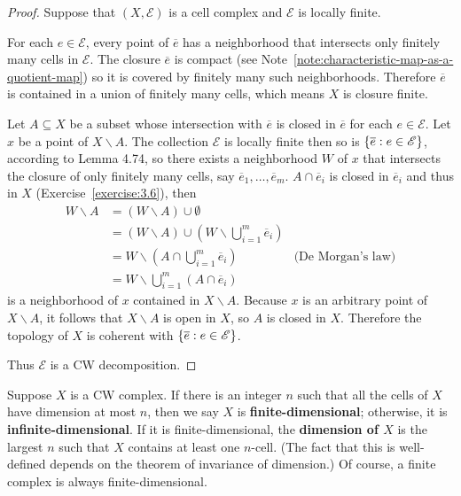 \begin{proof}
	Suppose that \( (X, \mathscr{E}) \) is a cell complex and \( \mathscr{E} \) is locally finite.

	For each \( e\in \mathscr{E} \), every point of \( \overline{e} \) has a neighborhood that intersects only finitely many cells in \( \mathscr{E} \). The closure \( \overline{e} \) is compact (see Note~\ref{note:characteristic-map-as-a-quotient-map}) so it is covered by finitely many such neighborhoods. Therefore \( \overline{e} \) is contained in a union of finitely many cells, which means \( X \) is closure finite.

	Let \( A \subseteq X \) be a subset whose intersection with \( \overline{e} \) is closed in \( \overline{e} \) for each \( e\in \mathscr{E} \). Let \( x \) be a point of \( X\smallsetminus A \). The collection \( \mathscr{E} \) is locally finite then so is \( \left\{{ \overline{e} : e\in\mathscr{E} }\right\} \), according to Lemma 4.74, so there exists a neighborhood \( W \) of \( x \) that intersects the closure of only finitely many cells, say \( \overline{e}_{1}, \ldots, \overline{e}_{m} \). \( A \cap \overline{e}_{i} \) is closed in \( \overline{e}_{i} \) and thus in \( X \) (Exercise~\ref{exercise:3.6}), then
    \begin{align*}
        W\smallsetminus A & = (W\smallsetminus A) \cup \emptyset \\
                          & = (W\smallsetminus A) \cup \left(W \smallsetminus \bigcup^{m}_{i=1}\overline{e}_{i} \right) \\
                          & = W \smallsetminus \left(A \cap \bigcup^{m}_{i=1}\overline{e}_{i}\right) & \text{(De Morgan's law)} \\
                          & = W \smallsetminus \bigcup^{m}_{i=1}(A\cap \overline{e}_{i})
    \end{align*}
    is a neighborhood of \( x \) contained in \( X\smallsetminus A \). Because \( x \) is an arbitrary point of \( X\smallsetminus A \), it follows that \( X\smallsetminus A \) is open in \( X \), so \( A \) is closed in \( X \). Therefore the topology of \( X \) is coherent with \( \left\{{ \overline{e} : e \in \mathscr{E} }\right\} \).

	Thus \( \mathscr{E} \) is a CW decomposition.
\end{proof}

Suppose \( X \) is a CW complex. If there is an integer \( n \) such that all the cells of \( X \) have dimension at most \( n \), then we say \( X \) is \textbf{finite-dimensional}; otherwise, it is \textbf{infinite-dimensional}. If it is finite-dimensional, the \textbf{dimension of \( X \)} is the largest \( n \) such that \( X \) contains at least one \( n \)-cell. (The fact that this is well-defined depends on the theorem of invariance of dimension.) Of course, a finite complex is always finite-dimensional.

